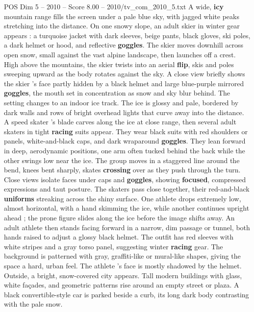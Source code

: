 \begin{textsample}{POS Dim 5 – 2010 – Score 8.00 – 2010/tv\_com\_2010\_5.txt}  \label{ex:f5_pos_048}
A wide, \textbf{icy} mountain range fills the screen under a pale blue sky, with jagged white peaks stretching into the distance.
On one snowy slope, an adult skier in winter gear appears : a turquoise jacket with dark sleeves, beige pants, black gloves, ski poles, a dark helmet or hood, and reflective \textbf{goggles}.
The skier moves downhill across open snow, small against the vast alpine landscape, then launches off a crest.
High above the mountains, the skier twists into an aerial \textbf{flip}, skis and poles sweeping upward as the body rotates against the sky.
A close view briefly shows the skier ’s face partly hidden by a black helmet and large blue-purple mirrored \textbf{goggles}, the mouth set in concentration as snow and sky blur behind.
The setting changes to an indoor ice track.
The ice is glossy and pale, bordered by dark walls and rows of bright overhead lights that curve away into the distance.
A speed skater ’s blade carves along the ice at close range, then several adult skaters in tight \textbf{racing} suits appear.
They wear black suits with red shoulders or panels, white-and-black caps, and dark wraparound \textbf{goggles}.
They lean forward in deep, aerodynamic positions, one arm often tucked behind the back while the other swings low near the ice.
The group moves in a staggered line around the bend, knees bent sharply, skates \textbf{crossing} over as they push through the turn.
Close views isolate faces under caps and \textbf{goggles}, showing \textbf{focused}, compressed expressions and taut posture.
The skaters pass close together, their red-and-black \textbf{uniforms} streaking across the shiny surface.
One athlete drops extremely low, almost horizontal, with a hand skimming the ice, while another continues upright ahead ; the prone figure slides along the ice before the image shifts away.
An adult athlete then stands facing forward in a narrow, dim passage or tunnel, both hands raised to adjust a glossy black helmet.
The outfit has red sleeves with white stripes and a gray torso panel, suggesting winter \textbf{racing} gear.
The background is patterned with gray, graffiti-like or mural-like shapes, giving the space a hard, urban feel.
The athlete ’s face is mostly shadowed by the helmet.
Outside, a bright, snow-covered city appears.
Tall modern buildings with glass, white façades, and geometric patterns rise around an empty street or plaza.
A black convertible-style car is parked beside a curb, its long dark body contrasting with the pale snow.

\end{textsample}
